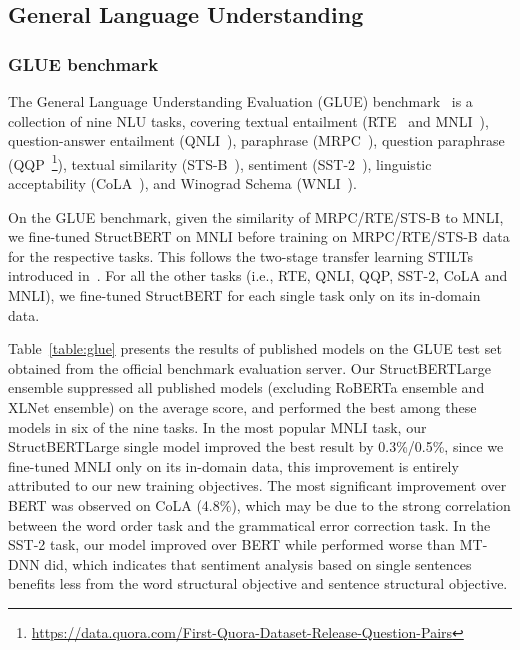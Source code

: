 \documentclass{article}
\begin{document}
\begin{table*}[ht]
\begin{tabular}{l|l|l|l|l|l|l|l|l|l|l|l}
\end{tabular}
\caption{Results of published models on the GLUE test set, which are scored by the GLUE evaluation server. The number below each task
denotes the number of training examples. The state-of-the-art results are in bold. All the results are obtained from \url{https://gluebenchmark.com/leaderboard} (StructBERT submitted under a different model name ALICE).}
\label{table:glue}
\end{table*}

\subsection{General Language Understanding}
\subsubsection{GLUE benchmark}
The General Language Understanding Evaluation (GLUE) benchmark~\cite{wang2018glue} is a collection of nine NLU tasks, covering textual entailment (RTE~\cite{bentivogli2009fifth} and MNLI~\cite{williams2017broad}), question-answer entailment (QNLI~\cite{wang2018glue}), paraphrase (MRPC~\cite{dolan2005automatically}), question paraphrase (QQP~\footnote{\small{\url{https://data.quora.com/First-Quora-Dataset-Release-Question-Pairs}}}), textual similarity (STS-B~\cite{cer2017semeval}), sentiment (SST-2~\cite{socher2013recursive}), linguistic acceptability (CoLA~\cite{warstadt2018neural}), and Winograd Schema (WNLI~\cite{levesque2012winograd}). 

On the GLUE benchmark, given the similarity of MRPC/RTE/STS-B to MNLI, we fine-tuned StructBERT on MNLI before training on MRPC/RTE/STS-B data for the respective tasks. This follows the two-stage transfer learning STILTs introduced in~\cite{phang2018sentence}. For all the other tasks (i.e., RTE, QNLI, QQP, SST-2, CoLA and MNLI), we fine-tuned StructBERT for each single task only on its in-domain data.

Table~\ref{table:glue} presents the results of published models on the GLUE test set obtained from the official benchmark evaluation server. Our StructBERT{\small Large} ensemble suppressed all published models (excluding RoBERTa ensemble and XLNet ensemble) on the average score, and performed the best among these models in six of the nine tasks. In the most popular MNLI task, our StructBERT{\small Large} single model improved the best result by 0.3\%/0.5\%, since we fine-tuned MNLI only on its in-domain data, this improvement is entirely attributed to our new training objectives. The most significant improvement over BERT was observed on CoLA (4.8\%), which may be due to the strong correlation between the word order task and the grammatical error correction task. In the SST-2 task, our model improved over BERT while performed worse than MT-DNN did, which indicates that sentiment analysis based on single sentences benefits less from the word structural objective and sentence structural objective.
\end{document}
